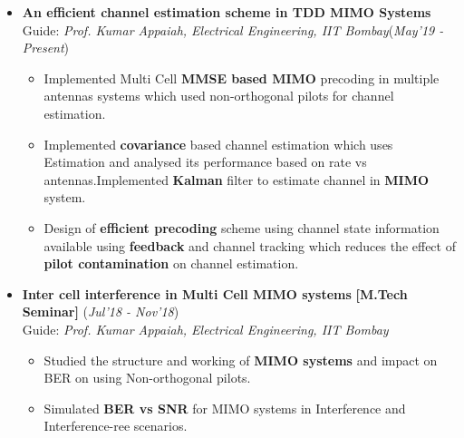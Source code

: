 \documentclass[10pt]{article}
\begin{document}

\vspace*{115pt}    %

\colorbox{bl}{}%
\vspace{-0.1cm}
\begin{itemize}[leftmargin=0.4cm]


\item \textbf{An efficient channel estimation scheme in TDD MIMO Systems}\\
Guide: \textit{Prof. Kumar Appaiah, Electrical Engineering, IIT Bombay}\hfill{(\textit{May’19 - Present})}\\\vspace{-0.68cm}
    \begin{itemize}[leftmargin=0.5cm]
    \item Implemented Multi Cell \textbf{MMSE based MIMO }precoding in multiple antennas systems which used
non-orthogonal pilots for channel estimation.\vspace{-0.1cm}
    \item Implemented \textbf{covariance} based channel estimation which uses  Estimation and analysed its performance based on rate vs antennas.Implemented \textbf{Kalman} filter to estimate channel in \textbf{MIMO} system.\vspace{-0.1cm}
    \item  Design of \textbf{efficient precoding }scheme using channel state information available using \textbf{feedback} and channel
tracking which reduces the effect of \textbf{pilot contamination} on channel estimation.\vspace{-0.1cm}

    \end{itemize}

\vspace{-0.25cm}

\item \textbf{Inter cell interference in Multi Cell MIMO systems
} \textbf{[M.Tech Seminar]}
\hfill{(\textit{Jul'18 - Nov'18})}\\
Guide: \textit{Prof. Kumar Appaiah, Electrical Engineering, IIT Bombay}\\\vspace{-0.68cm}
    \begin{itemize}
    \item Studied the structure and working of \textbf{MIMO systems} and impact on BER on using Non-orthogonal pilots.\vspace{-0.1cm}
    \item Simulated \textbf{BER vs SNR} for MIMO systems in Interference and Interference-ree scenarios.\vspace{-0.1cm}

    \end{itemize}\
    \vspace{-0.6cm}
\end{itemize}
\end{document}
